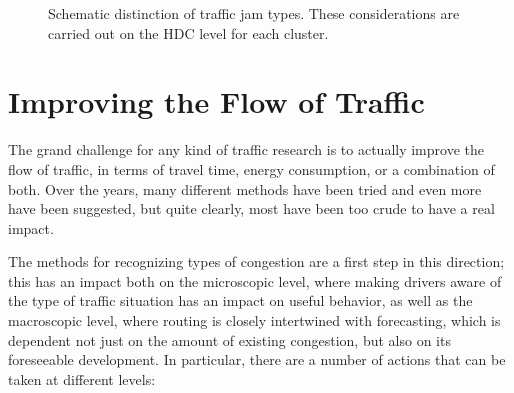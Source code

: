 \documentclass{acmrip}
\begin{document}
\iffalse
\begin{figure}[tp]
\centering \epsfig{file=jamtypes_diff_3.eps, width=.8\textwidth}
\caption{\label{jt}\small Schematic distinction of traffic jam
types. These considerations are carried out on the HDC level for
each cluster. }
\end{figure}
\fi

\begin{figure}[tp]
\centering {}
\caption{\label{jt}\small Schematic distinction of traffic jam
types. These considerations are carried out on the HDC level for
each cluster. }
\end{figure}


\section{Improving the Flow of Traffic}

The grand challenge for any kind of traffic research is to actually
improve the flow of traffic, in terms of travel time, 
energy consumption, or a combination of both. Over
the years, many different methods have been tried and even more have
been suggested, but quite clearly, most have been too crude to have
a real impact.

The methods for recognizing types of congestion are a first step
in this direction; this has an impact both on the microscopic level,
where making drivers aware of the type of traffic situation
has an impact on useful behavior, as well as the macroscopic
level, where routing is closely intertwined with forecasting,
which is dependent not just on the amount of existing congestion,
but also on its foreseeable development.
In particular, there are a number of actions that can be taken at different
levels:
\end{document}
